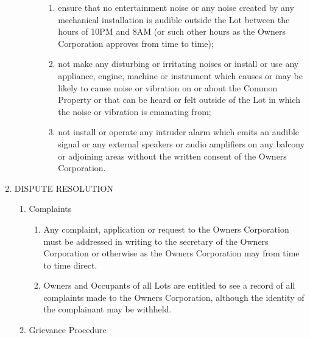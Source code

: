 \documentclass{article}
\begin{document}
\begin{enumerate}[label=\arabic*.]
\begin{enumerate}[label=\arabic{enumi}.\arabic*.]
\begin{enumerate}[label=(\arabic*)]
\begin{enumerate}[label=(\alph*)]
\item  ensure that no entertainment noise or any noise created by any mechanical installation is audible outside the Lot between the hours of 10PM and 8AM (or such other hours as the Owners Corporation approves from time to time);

\item  not make any disturbing or irritating noises or install or use any appliance, engine, machine or instrument which causes or may be likely to cause noise or vibration on or about the Common Property or that can be heard or felt outside of the Lot in which the noise or vibration is emanating from;

\item  not install or operate any intruder alarm which emits an audible signal or any external speakers or audio amplifiers on any balcony or adjoining areas without the written consent of the Owners Corporation.

\end{enumerate}

\end{enumerate}

\end{enumerate}

\item  DISPUTE RESOLUTION

\begin{enumerate}[label=\arabic{enumi}.\arabic*.]

\item  Complaints

\begin{enumerate}[label=(\arabic*)]

\item  Any complaint, application or request to the Owners Corporation must be addressed in writing to the secretary of the Owners Corporation or otherwise as the Owners Corporation may from time to time direct.

\item Owners and Occupants of all Lots are entitled to see a record of all complaints made to the Owners Corporation, although the identity of the complainant may be withheld.

\end{enumerate}

\item  Grievance Procedure

\begin{enumerate}[label=(\arabic*)]


\end{enumerate}
\end{enumerate}
\end{enumerate}
\end{document}
